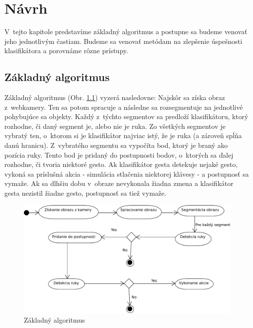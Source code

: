 \chapter{Návrh}\label{chap:design}

V~tejto kapitole predstavíme základný algoritmus a postupne sa budeme venovať jeho jednotlivým častiam. Budeme sa venovať metódam na zlepšenie úspešnosti klasifikátora a porovnáme rôzne prístupy. 
\bigskip

\section{Základný algoritmus}

Základný algoritmus (Obr. \ref{fig:base_alg}) vyzerá nasledovne: 
Najskôr sa získa obraz z~webkamery. Ten sa potom spracuje a následne sa rozsegmentuje na jednotlivé pohybujúce sa objekty.
Každý z~týchto segmentov sa predloží klasifikátoru, ktorý rozhodne, či daný segment je, alebo nie je ruka. Zo všetkých segmentov je vybratý ten, o~ktorom si je klasifikátor najviac istý, že je ruka (a zároveň spĺňa danú hranicu). Z~vybratého segmentu sa vypočíta bod, ktorý je braný ako pozícia ruky. Tento bod je pridaný do postupnosti bodov, o~ktorých sa ďalej rozhodne, či tvoria niektoré gesto. Ak klasifikátor gesta detekuje nejaké gesto, vykoná sa príslušná akcia - simulácia stlačenia niektorej klávesy - a postupnosť sa vymaže. Ak sa dlhšiu dobu v~obraze nevykonala žiadna zmena a klasifikátor gesta nezistil žiadne gesto, postupnosť sa tiež vymaže.

\begin{figure}[htp]
    \centering
    \includegraphics[width=\textwidth]{images/BaseAlgorithm}
    \caption{Základný algoritmus}
    \label{fig:base_alg}
\end{figure}

